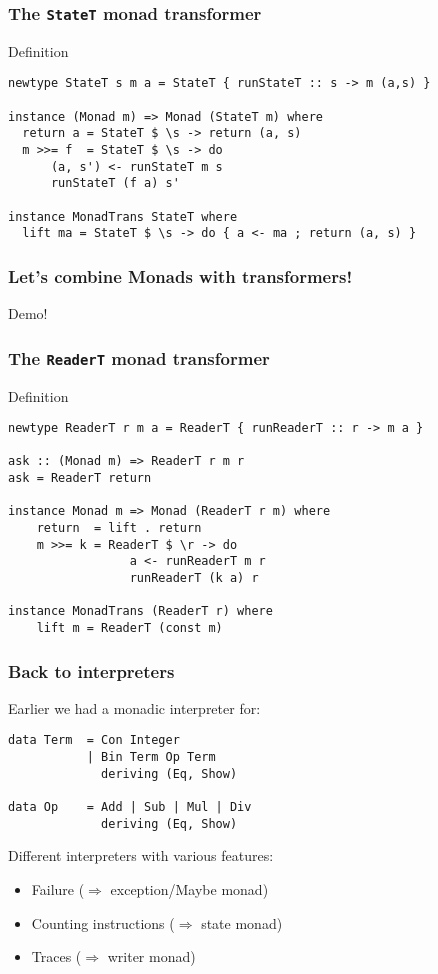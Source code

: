 \documentclass[pdftex,aspectratio=169]{beamer}
\begin{document}
\begin{frame}[fragile]
  \frametitle{The \texttt{StateT} monad transformer}
  \begin{block}{Definition}
\begin{lstlisting}
newtype StateT s m a = StateT { runStateT :: s -> m (a,s) }

instance (Monad m) => Monad (StateT m) where
  return a = StateT $ \s -> return (a, s)
  m >>= f  = StateT $ \s -> do
      (a, s') <- runStateT m s
      runStateT (f a) s'

instance MonadTrans StateT where
  lift ma = StateT $ \s -> do { a <- ma ; return (a, s) }
\end{lstlisting}
  \end{block}
\end{frame}


\begin{frame}[fragile]
  \frametitle{Let's combine Monads with transformers!}

  Demo!
\end{frame}


\begin{frame}[fragile]
  \frametitle{The \texttt{ReaderT} monad transformer}
  \begin{block}{Definition}
\begin{lstlisting}
newtype ReaderT r m a = ReaderT { runReaderT :: r -> m a }

ask :: (Monad m) => ReaderT r m r
ask = ReaderT return

instance Monad m => Monad (ReaderT r m) where
    return  = lift . return
    m >>= k = ReaderT $ \r -> do
                 a <- runReaderT m r
                 runReaderT (k a) r

instance MonadTrans (ReaderT r) where
    lift m = ReaderT (const m)
\end{lstlisting}
  \end{block}
\end{frame}

\begin{frame}[fragile]
  \frametitle{Back to interpreters}

  \begin{block}{Earlier we had a monadic interpreter for:}
    \begin{lstlisting}
data Term  = Con Integer
           | Bin Term Op Term
             deriving (Eq, Show)

data Op    = Add | Sub | Mul | Div
             deriving (Eq, Show)
    \end{lstlisting}
  \end{block}
  \pause
  Different interpreters with various features:
  \begin{itemize}
  \item Failure ($\Rightarrow$ exception/Maybe monad)
  \item Counting instructions ($\Rightarrow$ state monad)
  \item Traces ($\Rightarrow$ writer monad)
  \end{itemize}
\end{frame}
\end{document}
